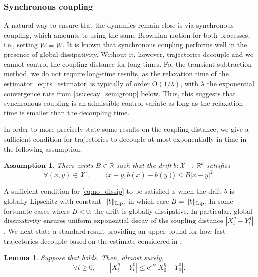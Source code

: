 \documentclass[11pt]{article}
\newcommand{\R}{\mathbb{R}}
\newcommand{\e}{\mathrm{e}}
\newcommand{\bigO}{\mathrm{O}}
\renewcommand{\geq}{\geqslant}
\renewcommand{\leq}{\leqslant}
\newtheorem{assumption}{Assumption}
\newtheorem{lemma}{Lemma}
\theoremstyle{definition}
\newcommand{\bLip}{\|b\|_{\rm Lip}}
\begin{document}
\subsubsection{Synchronous coupling}
\label{subsubsec:synchronous_coup}
A natural way to ensure that the dynamics remain close is via synchronous coupling, which amounts to using the same Brownian motion for both processes, i.e., setting $\widetilde{W} = W$. It is known that synchronous coupling performs well in the presence of global dissipativity. Without it, however, trajectories decouple and we cannot control the coupling distance for long times. For the transient subtraction method, we do not require long-time results, as the relaxation time of the estimator~\eqref{eq:ts_estimator} is typically of order $\bigO(1/\lambda)$, with $\lambda$ the exponential convergence rate from \cref{as:decay_semigroup} below. Thus, this suggests that synchronous coupling is an admissible control variate as long as the relaxation time is smaller than the decoupling time.

In order to more precisely state some results on the coupling distance, we give a sufficient condition for trajectories to decouple at most exponentially in time in the following assumption.

\begin{assumption}
\label{as:contractivity}
	There exists $B\in\R$ such that the drift $b\colon \mathcal{X} \to \R^d$ satisfies
\begin{equation}
		\forall (x,y) \in \mathcal{X}^2, \qquad \langle x-y, b(x)-b(y)\rangle \leq B|x-y|^2.
		\label{eq:no_dissip}
	\end{equation}
\end{assumption}

A sufficient condition for \eqref{eq:no_dissip} to be satisfied is when the drift $b$ is globally Lipschitz with constant~$\bLip$, in which case $B = \bLip$. In some fortunate cases where $B<0$, the drift is globally dissipative. In particular, global dissipativity ensures uniform exponential decay of the coupling distance $|X_t^\eta - Y_t^0|$.  We next state a standard result providing an upper bound for how fast trajectories decouple based on the estimate considered in .

\begin{lemma}
	\label{lemma:decoupling_times}
	Suppose that  holds. Then, almost surely,
\begin{equation}
\forall t\geq 0, \qquad |X_t^\eta - Y_t^0| \leq \e^{tB}|X_0^\eta - Y_0^0|.
	\label{eq:gronwall_decouple}
	\end{equation}
\end{lemma}
\end{document}
